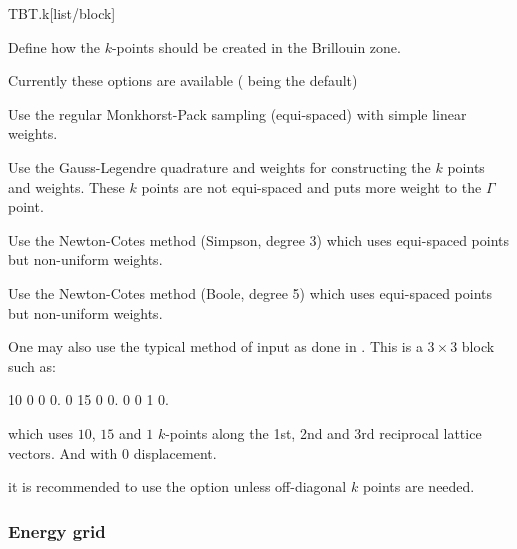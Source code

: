 \begin{fdfentry}{TBT.k}[list/block]
\begin{fdfoptions}
    \option[method]%

    Define how the $k$-points should be created in the Brillouin zone.

    Currently these options are available ( being
    the default)
    \begin{fdfoptions}


      Use the regular Monkhorst-Pack sampling (equi-spaced) with
      simple linear weights.



      Use the Gauss-Legendre quadrature and weights for constructing
      the $k$ points and weights. These $k$ points are not
      equi-spaced and puts more weight to the $\Gamma$ point.


      
      Use the Newton-Cotes method (Simpson, degree 3) which uses equi-spaced
      points but non-uniform weights.



      Use the Newton-Cotes method (Boole, degree 5) which uses equi-spaced
      points but non-uniform weights.

    \end{fdfoptions}


    One may also use the typical  method
    of input as done in \siesta. This is a $3\times3$ block such as:
    \begin{fdfexample}
  10  0  0 0.
   0 15  0 0.
   0  0  1 0.
    \end{fdfexample}
    which uses $10$, $15$ and $1$ $k$-points along the 1st, 2nd and
    3rd reciprocal lattice vectors. And with $0$ displacement.

    \note it is recommended to use the  option unless
    off-diagonal $k$ points are needed.

  \end{fdfoptions}
  
\end{fdfentry}


\subsubsection{Energy grid}

